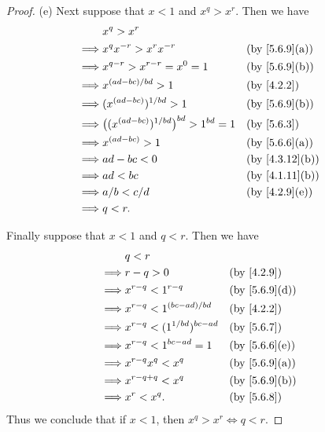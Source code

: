 \begin{proof}{(e)}
  Next suppose that \(x < 1\) and \(x^q > x^r\).
  Then we have
  \begin{align*}
             & x^q > x^r                                                                              \\
    \implies & x^q x^{-r} > x^r x^{-r}                              &  & \text{(by \cref{5.6.9}(a))}  \\
    \implies & x^{q - r} > x^{r - r} = x^0 = 1                      &  & \text{(by \cref{5.6.9}(b))}  \\
    \implies & x^{(ad - bc) / bd} > 1                               &  & \by{4.2.2}                   \\
    \implies & (x^{(ad - bc)})^{1 / bd} > 1                         &  & \text{(by \cref{5.6.9}(b))}  \\
    \implies & \big((x^{(ad - bc)})^{1 / bd}\big)^{bd} > 1^{bd} = 1 &  & \by{5.6.3}                   \\
    \implies & x^{(ad - bc)} > 1                                    &  & \text{(by \cref{5.6.6}(a))}  \\
    \implies & ad - bc < 0                                          &  & \text{(by \cref{4.3.12}(b))} \\
    \implies & ad < bc                                              &  & \text{(by \cref{4.1.11}(b))} \\
    \implies & a / b < c / d                                        &  & \text{(by \cref{4.2.9}(e))}  \\
    \implies & q < r.
  \end{align*}

  Finally suppose that \(x < 1\) and \(q < r\).
  Then we have
  \begin{align*}
             & q < r                                                               \\
    \implies & r - q > 0                          &  & \by{4.2.9}                  \\
    \implies & x^{r - q} < 1^{r - q}              &  & \text{(by \cref{5.6.9}(d))} \\
    \implies & x^{r - q} < 1^{(bc - ad) / bd}     &  & \by{4.2.2}                  \\
    \implies & x^{r - q} < (1^{1 / bd})^{bc - ad} &  & \by{5.6.7}                  \\
    \implies & x^{r - q} < 1^{bc - ad} = 1        &  & \text{(by \cref{5.6.6}(e))} \\
    \implies & x^{r - q} x^q < x^q                &  & \text{(by \cref{5.6.9}(a))} \\
    \implies & x^{r - q + q} < x^q                &  & \text{(by \cref{5.6.9}(b))} \\
    \implies & x^r < x^q.                         &  & \by{5.6.8}
  \end{align*}
  Thus we conclude that if \(x < 1\), then \(x^q > x^r \iff q < r\).
\end{proof}

